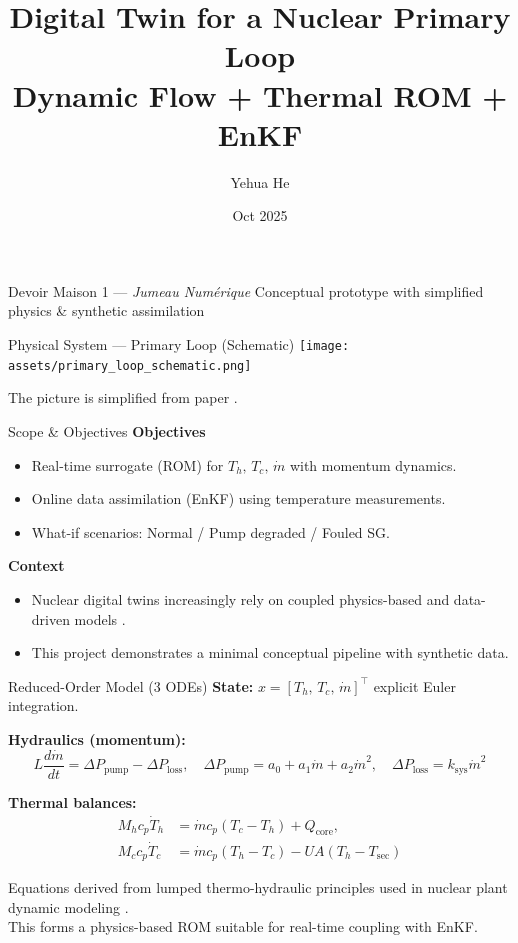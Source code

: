 \documentclass[aspectratio=169]{beamer}
\title[Digital Twin (Energy)]{Digital Twin for a Nuclear Primary Loop\\ \small Dynamic Flow + Thermal ROM + EnKF}
\author{Yehua He}
\institute{M2 ROM \& Data-Driven ROM — Université de Strasbourg}
\date{Oct 2025}
\begin{document}
\begin{frame}
  \titlepage
  \vspace{-0.5em}
  \footnotesize
  Devoir Maison 1 — \textit{Jumeau Numérique} \hfill
  Conceptual prototype with simplified physics \& synthetic assimilation
\end{frame}

\begin{frame}{Physical System — Primary Loop (Schematic)}
\centering
\texttt{[image: assets/primary\_loop\_schematic.png]}

\vspace{0.6em}
\footnotesize
The picture is simplified from paper \cite{noauthor_pdf_2025}.
\end{frame}

\begin{frame}{Scope \& Objectives}
\textbf{Objectives}
\begin{itemize}
  \item Real-time surrogate (ROM) for $T_h,\,T_c,\,\dot m$ with momentum dynamics.
  \item Online data assimilation (EnKF) using temperature measurements.
  \item What-if scenarios: Normal / Pump degraded / Fouled SG.
\end{itemize}

\textbf{Context}
\begin{itemize}
  \item Nuclear digital twins increasingly rely on coupled physics-based and data-driven models \cite{mengyan_current_2024, kochunas_digital_2021}.
  \item This project demonstrates a minimal conceptual pipeline with synthetic data.
\end{itemize}
\end{frame}

\begin{frame}{Reduced-Order Model (3 ODEs)}
\small
\textbf{State:} $x=[T_h,\,T_c,\,\dot m]^\top$ \hfill explicit Euler integration.

\medskip
\textbf{Hydraulics (momentum):}
\[
L \frac{d\dot m}{dt}=\Delta P_{\text{pump}}-\Delta P_{\text{loss}},\quad
\Delta P_{\text{pump}}=a_0+a_1\dot m + a_2 \dot m^2,\quad
\Delta P_{\text{loss}}=k_{\text{sys}}\dot m^2
\]

\textbf{Thermal balances:}
\[
\begin{aligned}
M_h c_p \dot T_h &= \dot m c_p (T_c-T_h)+Q_{\text{core}},\\
M_c c_p \dot T_c &= \dot m c_p (T_h-T_c)-UA(T_h-T_{\text{sec}})
\end{aligned}
\]

\medskip
\footnotesize
Equations derived from lumped thermo-hydraulic principles used in nuclear plant dynamic modeling \cite{dong_lumped-parameter_2018}.\\
This forms a physics-based ROM suitable for real-time coupling with EnKF.
\end{frame}
\end{document}
